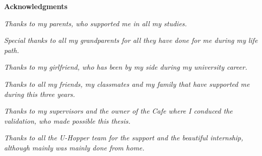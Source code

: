 \thispagestyle{empty}

\begin{center}
  {\bf \Huge Acknowledgments}
\end{center}

\vspace{4cm}


\emph{ Thanks to my parents, who supported me in all my studies. }

\emph{ Special thanks to all my grandparents for all they have done for me during my life path. }

\emph{ Thanks to my girlfriend, who has been by my side during my university career. }

\emph{ Thanks to all my friends, my classmates and my family that have supported me during this three years. }

\emph{ Thanks to my supervisors and the owner of the Cafe where I conduced the validation, who made possible this thesis. }

\emph{ Thanks to all the U-Hopper team for the support and the beautiful internship, although mainly was mainly done from home. }
